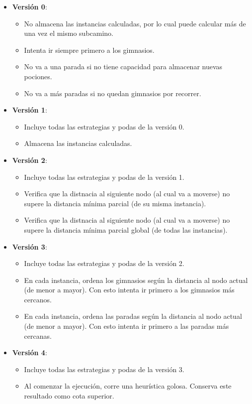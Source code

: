 \begin{itemize}
	\item \textbf{Versión 0}:
		\begin{itemize}
			\item No almacena las instancias calculadas, por lo cual puede calcular más de una vez el mismo subcamino.
			\item Intenta ir siempre primero a los gimnasios.
			\item No va a una parada si no tiene capacidad para almacenar nuevas pociones.
			\item No va a más paradas si no quedan gimnasios por recorrer.
		\end{itemize}
	\item \textbf{Versión 1}:
		\begin{itemize}
			\item Incluye todas las estrategias y podas de la versión 0.
			\item Almacena las instancias calculadas.
		\end{itemize}
	\item \textbf{Versión 2}:
		\begin{itemize}
			\item Incluye todas las estrategias y podas de la versión 1.
			\item Verifica que la distnacia al siguiente nodo (al cual va a moverse) no supere la distancia mínima parcial (de su misma instancia).
			\item Verifica que la distnacia al siguiente nodo (al cual va a moverse) no supere la distancia mínima parcial global (de todas las instancias).
		\end{itemize}
	\item \textbf{Versión 3}:
		\begin{itemize}
			\item Incluye todas las estrategias y podas de la versión 2.
			\item En cada instancia, ordena los gimnasios según la distancia al nodo actual (de menor a mayor). Con esto intenta ir primero a los gimnasios más cercanos.
			\item En cada instancia, ordena las paradas según la distancia al nodo actual (de menor a mayor). Con esto intenta ir primero a las paradas más cercanas.
		\end{itemize}
	\item \textbf{Versión 4}:
		\begin{itemize}
			\item Incluye todas las estrategias y podas de la versión 3.
			\item Al comenzar la ejecución, corre una heurística golosa. Conserva este resultado como cota superior.
		\end{itemize}
\end{itemize}

